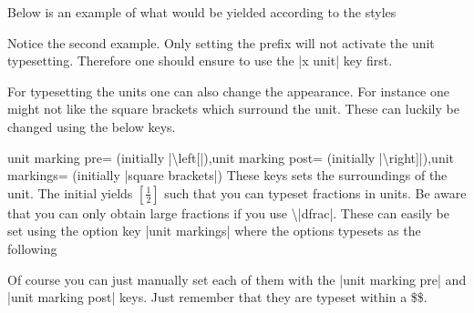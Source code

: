 Below is an example of what would be yielded according to the styles
\begin{codeexample}
  \pgfplotsset{use units,x unit=T,xlabel=Temperature,ylabel=Nothing} 
  \pgfplotsset{use units,x unit prefix=m,xlabel=Temperature,ylabel=Nothing} 
\end{codeexample}
Notice the second example. Only setting the prefix will not activate the unit typesetting. Therefore one should ensure to use the |x unit| key first.

For typesetting the units one can also change the appearance. For instance one might not like the square brackets which surround the unit. These can
luckily be changed using the below keys.
\begin{pgfplotskeylist}{unit marking pre= (initially |\textbackslash left[|),unit marking post= (initially |\textbackslash right]|),unit markings= (initially |square brackets|)}
  These keys sets the surroundings of the unit. The initial yields $\left[\frac{1}{2}\right]$ such that you can typeset fractions in units. Be aware that
  you can only obtain large fractions if you use \textbackslash|dfrac|. These can easily be set using the option key |unit markings| where the options typesets as the following
\begin{codeexample}
  \pgfplotsset{x unit=T,unit markings=parenthesis} %
  \pgfplotsset{x unit=T,unit markings=square brackets} %
  \pgfplotsset{x unit=T,unit markings=slash space} %
\end{codeexample}
  Of course you can just manually set each of them with the |unit marking pre| and |unit marking post| keys. Just remember that they are typeset within a \$\$.
\end{pgfplotskeylist}

